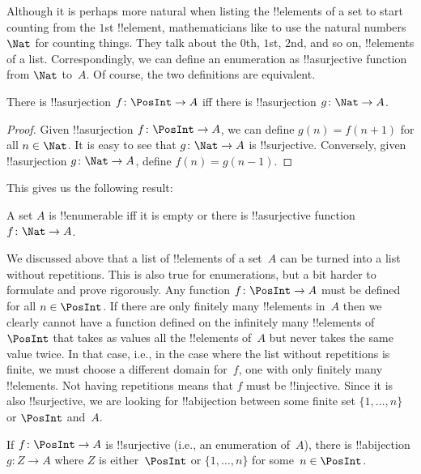 \documentclass[../../../include/open-logic-section]{subfiles}
\begin{document}
Although it is perhaps more natural when listing the !!{element}s of a
set to start counting from the $1$st !!{element}, mathematicians like
to use the natural numbers~$\Nat$ for counting things. They
talk about the $0$th, $1$st, $2$nd, and so on, !!{element}s of a list.
Correspondingly, we can define an enumeration as !!a{surjective}
function from $\Nat$ to~$A$. Of course, the two definitions are
equivalent.

\begin{prop}
  There is !!a{surjection} $f\colon \PosInt \to A$ iff there is
  !!a{surjection} $g\colon \Nat \to A$.
\end{prop}

\begin{proof}
  Given !!a{surjection} $f\colon \PosInt \to A$, we can define $g(n) =
  f(n+1)$ for all $n \in \Nat$. It is easy to see that $g\colon \Nat
  \to A$ is !!{surjective}. Conversely, given !!a{surjection} $g\colon
  \Nat \to A$, define $f(n) = g(n-1)$.
\end{proof}

This gives us the following result:

\begin{cor}
A set $A$ is !!{enumerable} iff it is empty or there is
!!a{surjective} function $f\colon \Nat \to A$.
\end{cor}

We discussed above that a list of !!{element}s of a set~$A$ can be
turned into a list without repetitions. This is also true for
enumerations, but a bit harder to formulate and prove rigorously. Any
function $f\colon \PosInt \to A$ must be defined for all $n \in
\PosInt$. If there are only finitely many !!{element}s in~$A$ then we
clearly cannot have a function defined on the infinitely many
!!{element}s of~$\PosInt$ that takes as values all the !!{element}s
of~$A$ but never takes the same value twice. In that case, i.e., in
the case where the list without repetitions is finite, we must choose
a different domain for~$f$, one with only finitely many !!{element}s.
Not having repetitions means that $f$ must be !!{injective}. Since it
is also !!{surjective}, we are looking for !!a{bijection} between some
finite set $\{1, \dots, n\}$ or $\PosInt$ and~$A$.

\begin{prop}
If $f\colon \PosInt \to A$ is !!{surjective} (i.e., an enumeration
of~$A$), there is !!a{bijection} $g\colon Z \to A$ where $Z$ is
either~$\PosInt$ or $\{1, \dots, n\}$ for some~$n \in \PosInt$.
\end{prop}
\end{document}

